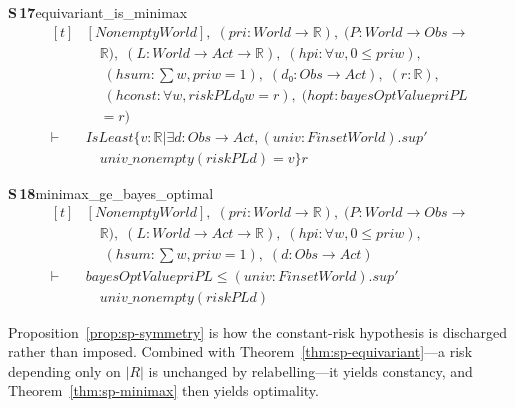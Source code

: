 \documentclass[conference]{IEEEtran}
\theoremstyle{definition}
\newcommand{\lean}[1]{\textsf{\footnotesize #1}}
\begin{document}
\noindent\textbf{S\,17}\quad\lean{equivariant\_is\_minimax}
{\footnotesize\[ \begin{aligned}[t]
&[\mathit{Nonempty} \mathit{World}],\; (\mathit{pri} : \mathit{World} \to \mathbb{R} ),\; (\mathit{P} : \mathit{World} \to \mathit{Obs} \to\\
&\quad \mathbb{R} ),\; (\mathit{L} : \mathit{World} \to \mathit{Act} \to \mathbb{R} ),\; (\mathit{hpi} : \forall \mathit{w}, 0 \leq \mathit{pri} \mathit{w}),\\
&\quad \; (\mathit{hsum} : \textstyle\sum \mathit{w}, \mathit{pri} \mathit{w} = 1),\; (\mathit{d₀} : \mathit{Obs} \to \mathit{Act}),\; (\mathit{r} : \mathbb{R} ),\\
&\quad \; (\mathit{hconst} : \forall \mathit{w}, \mathit{risk} \mathit{P} \mathit{L} \mathit{d₀} \mathit{w} = \mathit{r}),\; (\mathit{hopt} : \mathit{bayesOptValue} \mathit{pri} \mathit{P} \mathit{L}\\
&\quad = \mathit{r})\\
\vdash\;&\mathit{IsLeast} \{ \mathit{v} : \mathbb{R} | \exists \mathit{d} : \mathit{Obs} \to \mathit{Act}, (\mathit{univ} : \mathit{Finset} \mathit{World}).\mathit{sup'}\\
&\quad \mathit{univ\_nonempty} (\mathit{risk} \mathit{P} \mathit{L} \mathit{d}) = \mathit{v}\} \mathit{r}
\end{aligned} \]}

\noindent\textbf{S\,18}\quad\lean{minimax\_ge\_bayes\_optimal}
{\footnotesize\[ \begin{aligned}[t]
&[\mathit{Nonempty} \mathit{World}],\; (\mathit{pri} : \mathit{World} \to \mathbb{R} ),\; (\mathit{P} : \mathit{World} \to \mathit{Obs} \to\\
&\quad \mathbb{R} ),\; (\mathit{L} : \mathit{World} \to \mathit{Act} \to \mathbb{R} ),\; (\mathit{hpi} : \forall \mathit{w}, 0 \leq \mathit{pri} \mathit{w}),\\
&\quad \; (\mathit{hsum} : \textstyle\sum \mathit{w}, \mathit{pri} \mathit{w} = 1),\; (\mathit{d} : \mathit{Obs} \to \mathit{Act})\\
\vdash\;&\mathit{bayesOptValue} \mathit{pri} \mathit{P} \mathit{L} \leq (\mathit{univ} : \mathit{Finset} \mathit{World}).\mathit{sup'}\\
&\quad \mathit{univ\_nonempty} (\mathit{risk} \mathit{P} \mathit{L} \mathit{d})
\end{aligned} \]}


Proposition~\ref{prop:sp-symmetry} is how the constant-risk hypothesis is discharged rather than
imposed. Combined with Theorem~\ref{thm:sp-equivariant}---a risk depending only on $|R|$ is
unchanged by relabelling---it yields constancy, and Theorem~\ref{thm:sp-minimax} then yields
optimality.
\end{document}
